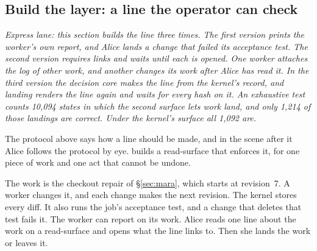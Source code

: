 %
%
\subsection{Build the layer: a line the operator can check}
\label{sec:ls-line}

\noindent\emph{Express lane: this section builds the line three times. The
first version prints the worker's own report, and Alice lands a change
that failed its acceptance test. The second version requires links and
waits until each is opened. One worker attaches the log of other work, and
another changes its work after Alice has read it. In the third version the
decision core makes the line from the kernel's record, and landing renders
the line again and waits for every hash on it. An exhaustive test counts
10,094 states in which the second surface lets work land, and only 1,214
of those landings are correct. Under the kernel's surface all 1,092 are.}

The protocol above says how a line should be made, and in the scene after
it Alice follows the protocol by eye. \pdkernelname{} builds a
read-surface that enforces it, for one piece of work and one act that
cannot be undone.

The work is the checkout repair of \S\ref{sec:mara}, which starts at
revision~7. A worker changes it, and each change makes the next revision.
The kernel stores every diff. It also runs the job's acceptance test, and
a change that deletes that test fails it. The worker can report on its
work. Alice reads one line about the work on a read-surface and opens what
the line links to. Then she lands the work or leaves it.

